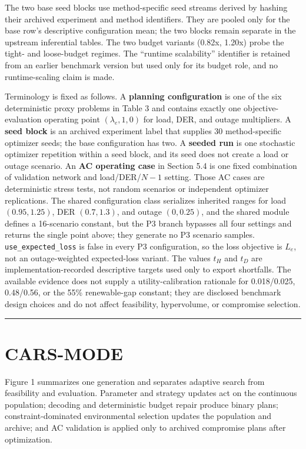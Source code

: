 \documentclass[energies,article,submit,moreauthors]{Definitions/mdpi}
\begin{document}
The two base seed blocks use method-specific seed streams derived by hashing their archived experiment and method identifiers. They are pooled only for the base row's descriptive configuration mean; the two blocks remain separate in the upstream inferential tables. The two budget variants (0.82x, 1.20x) probe the tight- and loose-budget regimes. The ``runtime scalability'' identifier is retained from an earlier benchmark version but used only for its budget role, and no runtime-scaling claim is made.

Terminology is fixed as follows. A \textbf{planning configuration} is one of the six deterministic proxy problems in Table 3 and contains exactly one objective-evaluation operating point \((\lambda_e,1,0)\) for load, DER, and outage multipliers. A \textbf{seed block} is an archived experiment label that supplies 30 method-specific optimizer seeds; the base configuration has two. A \textbf{seeded run} is one stochastic optimizer repetition within a seed block, and its seed does not create a load or outage scenario. An \textbf{AC operating case} in Section 5.4 is one fixed combination of validation network and load/DER/\(N-1\) setting. Those AC cases are deterministic stress tests, not random scenarios or independent optimizer replications. The shared configuration class serializes inherited ranges for load \((0.95,1.25)\), DER \((0.7,1.3)\), and outage \((0,0.25)\), and the shared module defines a 16-scenario constant, but the P3 branch bypasses all four settings and returns the single point above; they generate no P3 scenario samples. \texttt{use\_expected\_loss} is false in every P3 configuration, so the loss objective is \(L_e\), not an outage-weighted expected-loss variant. The values \(t_H\) and \(t_D\) are implementation-recorded descriptive targets used only to export shortfalls. The available evidence does not supply a utility-calibration rationale for 0.018/0.025, 0.48/0.56, or the 55\% renewable-gap constant; they are disclosed benchmark design choices and do not affect feasibility, hypervolume, or compromise selection.

\begin{center}\rule{0.5\linewidth}{0.5pt}\end{center}

\section{CARS-MODE}\label{cars-mode}

Figure 1 summarizes one generation and separates adaptive search from feasibility and evaluation. Parameter and strategy updates act on the continuous population; decoding and deterministic budget repair produce binary plans; constraint-dominated environmental selection updates the population and archive; and AC validation is applied only to archived compromise plans after optimization.
\end{document}
